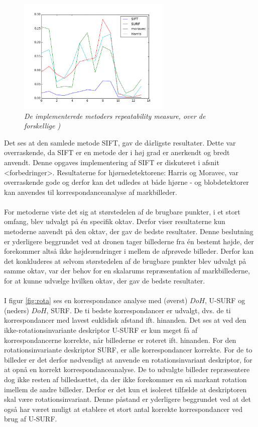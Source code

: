 \begin{figure}[H]
    \centering
    \includegraphics[width=0.65\textwidth]{fig/repeatabilitygraph.png}
     \vspace{-1em}
    \begin{center}        
     \caption{{\footnotesize \textit{
De implementerede metoders repeatability measure, over de forskellige )}}}
    \label{fig:graf}
     \end{center}
       \vspace{-2.5em}
  \end{figure}
\noindent
Det ses at den samlede metode SIFT, gav de dårligste resultater. Dette var overraskende, da SIFT er en metode der i høj grad er anerkendt og bredt anvendt. Denne opgaves implementering af SIFT er diskuteret i afsnit <forbedringer>. Resultaterne for hjørnedetektorene: Harris og Moravec, var overraskende gode og derfor kan det udledes at både hjørne - og blobdetektorer kan anvendes til korrespondanceanalyse af markbilleder.
\\ \\
For metoderne viste det sig at størstedelen af de brugbare punkter, i et stort omfang, blev udvalgt på én specifik oktav. Derfor viser resultaterne kun metoderne anvendt på den oktav, der gav de bedste resultater. Denne beslutning er yderligere beggrundet ved at dronen tager billederne fra én bestemt højde, der forekommer altså ikke højdeændringer i mellem de afprøvede billeder. Derfor kan det konkluderes at selvom størstedelen af de brugbare punkter blev udvalgt på samme oktav, var der behov for en skalarums repræsentation af markbillederne, for at kunne udvælge hvilken oktav, der gav de bedste resultater.
\\ \\
I figur \ref{fig:rota} ses en korrespondance analyse med (øverst) $DoH$, U-SURF og (neders) $DoH$, SURF. De ti bedste korrespondancer er udvalgt, dvs. de ti korrespondancer med lavest euklidisk afstand ift. hinanden. Det ses at ved den ikke-rotationsinvariante deskriptor U-SURF er kun meget få af korrespondancerne korrekte, når billederne er roteret ift. hinanden. For den rotationsinvariante deskriptor SURF, er alle korrespondancer korrekte. For de to billeder er det derfor nødvendigt at anvende en rotationsinvariant deskriptor, for at opnå en korrekt korrespondanceanalyse. De to udvalgte billeder repræsentere dog ikke resten af billedsættet, da der ikke forekommer en så markant rotation imellem de andre billeder. Derfor er det kun et isoleret tilfælde at deskriptoren skal være rotationsinvariant. Denne påstand er yderligere beggrundet ved at det også har været muligt at etablere et stort antal korrekte korrespondancer ved brug af U-SURF.
